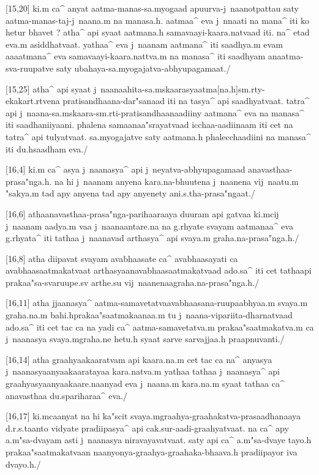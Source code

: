 [15,20]	ki.m ca^ anyat aatma-manas-sa.myogaad apuurva-j~naanotpattau saty 
aatma-manas-taj-j~naana.m na manasa.h. aatmaa^ eva j~nnaati na mana^ iti ko hetur 
bhavet ? atha^ api syaat aatmana.h samavaayi-kaara.natvaad iti. na^ etad eva.m 
asiddhatvaat. yathaa^ eva j~naanam aatmana^ iti saadhya.m evam aaaatmana^ eva 
samavaayi-kaara.nattva.m na manasa^ iti saadhyam anaatma-sva-ruupatve saty 
ubahaya-sa.myogajatva-abhyupagamaat./

[15,25]	atha^ api syaat j~naanaahita-sa.mskaarasyaatma[na.h]sm.rty-ekakart.rtvena 
pratisandhaana-dar"sanaad iti na tasya^ api saadhyatvaat. tatra^ api 
j~naana-sa.mskaara-sm.rti-pratisandhaanaadiiny\label{JSSP04} aatmana^ eva na manasa^ iti 
saadhaniiyaani. phalena samaanaa"srayatvaad icchaa-aadiinaam iti cet na tatra^ api 
tulyatvaat. sa.myogajatve saty aatmana.h phalecchaadiini na manasa^ iti du.hsaadham 
eva./

[16,4]	ki.m ca^ asya j~naanasya^ api j~neyatva-abhyupagamaad 
anavasthaa-prasa"nga.h. na hi j~naanam anyena kara.na-bhuutena j~naanena vij~naatu.m 
"sakya.m tad apy anyena tad apy anyenety ani.s.tha-prasa"ngaat./

[16,6]	athaanavasthaa-prasa"nga-parihaaraaya duuram api gatvaa ki.mcij j~naanam 
aadya.m vaa j~naanaantare.na na g.rhyate svayam aatmanaa^ eva g.rhyata^ iti tathaa 
j~naanavad arthasya^ api svaya.m graha.na-prasa"nga.h./

[16,8]	atha diipavat svayam avabhaasate ca^ avabhaasayati ca 
avabhaasaatmakatvaat arthasyaanavabhaasaatmakatvaad ado.sa^ iti cet tathaapi 
prakaa"sa-svaruupe.sv arthe.su vij~naanenaagraha.na-prasa"nga.h./

[16,11]	atha jjaanasya^ aatma-samavetatvaavabhaasana-ruupaabhyaa.m svaya.m graha.na.m 
bahi.hprakaa"saatmakaanaa.m tu j~naana-vipariita-dharnatvaad ado.sa^ iti cet tac ca na 
yadi ca^ aatma-samavetatva.m prakaa"saatmakatva.m ca j~naanasya svaya.mgraha.ne 
hetu.h syaat sarve sarvajjaa.h praapnuvanti./

[16,14]	atha graahyaakaaratvam api kaara.na.m cet tac ca na^ anyasya 
j~naanasyaanyaakaaratayaa kara.natva.m yathaa tathaa j~naanasya^ api 
graahyasyaanyaakaare.naanyad eva j~naana.m kara.na.m syaat tathaa ca^ anavasthaa 
du.spariharaa^ eva./

[16,17]	ki.mcaanyat na hi ka"scit svaya.mgraahya-graahakatva-prasaadhanaaya 
d.r.s.taanto vidyate pradiipasya^ api cak.sur-aadi-graahyatvaat. na ca^ apy 
a.m"sa-dvayam asti j~naanasya niravayavatvaat. saty api ca^ a.m"sa-dvaye tayo.h 
prakaa"saatmakatvaan naanyonya-graahya-graahaka-bhaava.h pradiipayor iva dvayo.h./

